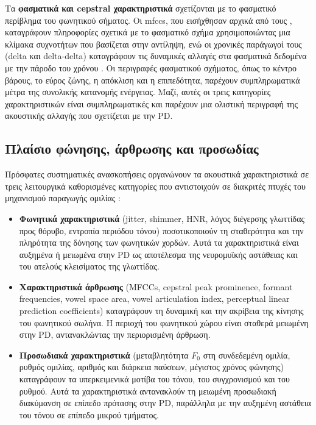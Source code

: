 Τα \textbf{φασματικά και cepstral χαρακτηριστικά} σχετίζονται με το φασματικό περίβλημα του φωνητικού σήματος. Οι \gls{mfcc}s, που εισήχθησαν αρχικά από τους \citet{davis1980comparison}, καταγράφουν πληροφορίες σχετικά με το φασματικό σχήμα χρησιμοποιώντας μια κλίμακα συχνοτήτων που βασίζεται στην αντίληψη, ενώ οι χρονικές παράγωγοί τους (delta και delta-delta) καταγράφουν τις δυναμικές αλλαγές στα φασματικά δεδομένα με την πάροδο του χρόνου \citep{orozco2016automatic}. Οι περιγραφές φασματικού σχήματος, όπως το κέντρο βάρους, το εύρος ζώνης, η απόκλιση και η επιπεδότητα, παρέχουν συμπληρωματικά μέτρα της συνολικής κατανομής ενέργειας. Μαζί, αυτές οι τρεις κατηγορίες χαρακτηριστικών είναι συμπληρωματικές και παρέχουν μια ολιστική περιγραφή της ακουστικής αλλαγής που σχετίζεται με την PD.

\subsection{Πλαίσιο φώνησης, άρθρωσης και προσωδίας}
\label{sec:phonation-articulation-prosody}

Πρόσφατες συστηματικές ανασκοπήσεις οργανώνουν τα ακουστικά χαρακτηριστικά σε τρεις λειτουργικά καθορισμένες κατηγορίες που αντιστοιχούν σε διακριτές πτυχές του μηχανισμού παραγωγής ομιλίας \citep{wright2025vocal}:

\begin{itemize}
    \item \textbf{Φωνητικά χαρακτηριστικά} (\gls{jitter}, \gls{shimmer}, HNR, λόγος διέγερσης γλωττίδας προς θόρυβο, εντροπία περιόδου τόνου) ποσοτικοποιούν τη σταθερότητα και την πληρότητα της δόνησης των φωνητικών χορδών. Αυτά τα χαρακτηριστικά είναι αυξημένα ή μειωμένα στην PD ως αποτέλεσμα της νευρομυϊκής αστάθειας και του ατελούς κλεισίματος της γλωττίδας.
    \item \textbf{Χαρακτηριστικά άρθρωσης} (MFCCs, cepstral peak prominence, formant frequencies, vowel space area, vowel articulation index, perceptual linear prediction coefficients) καταγράφουν τη δυναμική και την ακρίβεια της κίνησης του φωνητικού σωλήνα. Η περιοχή του φωνητικού χώρου είναι σταθερά μειωμένη στην PD, αντανακλώντας την περιορισμένη άρθρωση.
    \item \textbf{Προσωδιακά χαρακτηριστικά} (μεταβλητότητα $F_0$ στη συνδεδεμένη ομιλία, ρυθμός ομιλίας, αριθμός και διάρκεια παύσεων, μέγιστος χρόνος φώνησης) καταγράφουν τα υπερκειμενικά μοτίβα του τόνου, του συγχρονισμού και του ρυθμού. Αυτά τα χαρακτηριστικά αντανακλούν τη μειωμένη προσωδιακή διακύμανση σε επίπεδο πρότασης στην PD, παράλληλα με την αυξημένη αστάθεια του τόνου σε επίπεδο μικρού τμήματος.
\end{itemize}

